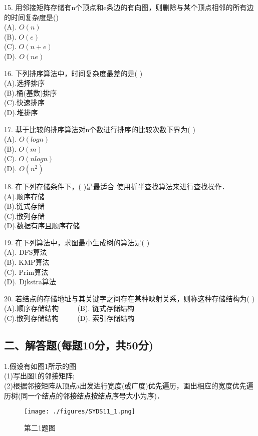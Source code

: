 15. 用邻接矩阵存储有n个顶点和e条边的有向图，则删除与某个顶点相邻的所有边的时间复杂度是() \\
(A). $O(n)$ \\
(B). $O(e)$ \\
(C). $O(n+e)$ \\
(D). $O(ne)$

16. 下列排序算法中，时间复杂度最差的是( ) \\
(A).选择排序 \\
(B).桶(基数)排序 \\
(C).快速排序 \\
(D).堆排序

17. 基于比较的排序算法对n个数进行排序的比较次数下界为( ) \\
(A). $O(logn)$ \\
(B). $O(m)$  \\
(C). $O(nlogn)$ \\
(D). $O(n^2)$

18. 在下列存储条件下，( )是最适合 使用折半查找算法来进行查找操作． \\
(A).顺序存储 \\
(B).链式存储 \\
(C).散列存储 \\
(D).数据有序且顺序存储

19. 在下列算法中，求图最小生成树的算法是( ) \\
(A). DFS算法 \\
(B). KMP算法 \\
(C). Prim算法 \\
(D). Djkstra算法

20. 若结点的存储地址与其关键字之间存在某种映射关系，则称这种存储结构为( ) \\
(A).顺序存储结构 $\qquad$ (B). 链式存储结构 \\
(C).散列存储结构 $\qquad$ (D). 索引存储结构

\subsection{二、解答题(每题10分，共50分)}

1.假设有如图1所示的图 \\
(1)写出图1的邻接矩阵; \\
(2)根据邻接矩阵从顶点a出发进行宽度(或广度)优先遍历，画出相应的宽度优先遍历树(同一个结点的邻接结点按结点序号大小为序)．
\begin{figure}[ht]
\centering
\texttt{[image: ./figures/SYDS11\_1.png]}
\caption{第二1题图} \label{SYDS11_fig1}
\end{figure}

